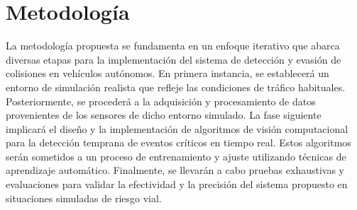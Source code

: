 \documentclass[10pt,letterpaper,final]{article}
\begin{document}
    \section*{Metodología}
    \noindent La metodología propuesta se fundamenta en un enfoque iterativo que abarca diversas etapas para la implementación del sistema de detección
    y evasión de colisiones en vehículos autónomos. En primera instancia, se establecerá un entorno de simulación realista que refleje las condiciones de tráfico habituales.
    Posteriormente, se procederá a la adquisición y procesamiento de datos provenientes de los sensores de dicho entorno simulado. La fase siguiente implicará el diseño
    y la implementación de algoritmos de visión computacional para la detección temprana de eventos críticos en tiempo real. Estos algoritmos serán sometidos a un proceso
    de entrenamiento y ajuste utilizando técnicas de aprendizaje automático. Finalmente, se llevarán a cabo pruebas exhaustivas y evaluaciones para validar la efectividad
    y la precisión del sistema propuesto en situaciones simuladas de riesgo vial.
    
\end{document}
